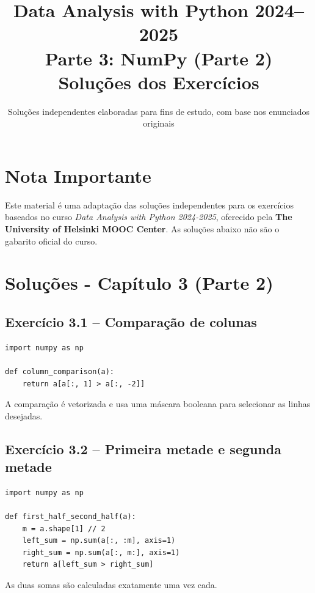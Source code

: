 \documentclass[11pt,a4paper]{article}
\title{\textbf{Data Analysis with Python 2024--2025}\\Parte 3: NumPy (Parte 2)\\\large Soluções dos Exercícios}
\author{Soluções independentes elaboradas para fins de estudo, com base nos enunciados originais}
\date{}
\begin{document}
\maketitle

\section*{Nota Importante}
Este material é uma adaptação das soluções independentes para os exercícios baseados no curso \textit{Data Analysis with Python 2024-2025}, oferecido pela \textbf{The University of Helsinki MOOC Center}. As soluções abaixo não são o gabarito oficial do curso.

\tableofcontents
\newpage

\section{Soluções - Capítulo 3 (Parte 2)}

\subsection*{Exercício 3.1 -- Comparação de colunas}
\begin{solucao}
\begin{lstlisting}
import numpy as np

def column_comparison(a):
    return a[a[:, 1] > a[:, -2]]
\end{lstlisting}
A comparação é vetorizada e usa uma máscara booleana para selecionar as linhas desejadas.
\end{solucao}

\subsection*{Exercício 3.2 -- Primeira metade e segunda metade}
\begin{solucao}
\begin{lstlisting}
import numpy as np

def first_half_second_half(a):
    m = a.shape[1] // 2
    left_sum = np.sum(a[:, :m], axis=1)
    right_sum = np.sum(a[:, m:], axis=1)
    return a[left_sum > right_sum]
\end{lstlisting}
As duas somas são calculadas exatamente uma vez cada.
\end{solucao}
\end{document}
